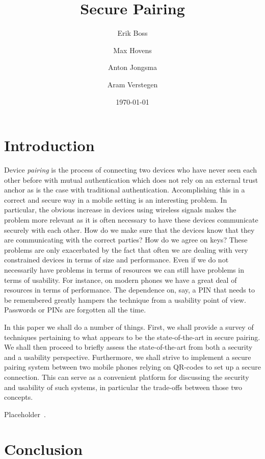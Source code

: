 \documentclass[conference, 11pt]{sty/IEEEtran}
\title{Secure Pairing}
\author{Erik Boss \and Max Hovens \and Anton Jongsma \and Aram Verstegen}
\date{\today}
\begin{document}
\maketitle

\begin{abstract}
    
\end{abstract}

\section{Introduction}
\label{sec:introduction}


Device \textit{pairing} is the process of connecting two devices who have never seen each other before with mutual authentication which does not rely on an external trust anchor as is the case with traditional authentication.
Accomplishing this in a correct and secure way in a mobile setting is an interesting problem.
In particular, the obvious increase in devices using wireless signals makes the problem more relevant as it is often necessary to have these devices communicate securely with each other.
How do we make sure that the devices know that they are communicating with the correct parties?
How do we agree on keys?
These problems are only exacerbated by the fact that often we are dealing with very constrained devices in terms of size and performance.
Even if we do not necessarily have problems in terms of resources we can still have problems in terms of usability.
For instance, on modern phones we have a great deal of resources in terms of performance.
The dependence on, say, a PIN that needs to be remembered greatly hampers the technique from a usability point of view. 
Passwords or PINs are forgotten all the time.

In this paper we shall do a number of things.
First, we shall provide a survey of techniques pertaining to what appears to be the state-of-the-art in secure pairing.
We shall then proceed to briefly assess the state-of-the-art from both a security and a usability perspective.
Furthermore, we shall strive to implement a secure pairing system between two mobile phones relying on QR-codes to set up a secure connection.
This can serve as a convenient platform for discussing the security and usability of such systems, in particular the trade-offs between those two concepts.

Placeholder~\cite{uzun2007usability}.

\section{Conclusion}
\label{sec:conclusion}



\end{document}

